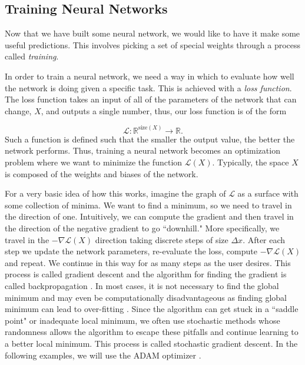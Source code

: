 \documentclass{CUP-JNL-DTM}%
\theoremstyle{definition}
\numberwithin{equation}{section}
\newcommand{\loss}{\mathcal{L}}
\newcommand{\Define}{\emph}
\begin{document}

\subsection{Training Neural Networks}

Now that we have built some neural network, we would like to have it make some useful predictions. This involves picking a set of special weights through a process called \Define{training}. 

In order to train a neural network, we need a way in which to evaluate how well the network is doing given a specific task. This is achieved with a \emph{loss function}. The loss function takes an input of all of the parameters of the network that can change, $X$, and outputs a single number, thus, our loss function is of the form

\begin{equation}
    \loss \colon \mathbb{R}^{\textrm{size}(X)} \rightarrow \mathbb{R}. 
\end{equation}
Such a function is defined such that the smaller the output value, the better the network performs. Thus, training a neural network becomes an optimization problem where we want to minimize the function $\loss(X)$. Typically, the space $X$ is composed of the weights and biases of the network. 

For a very basic idea of how this works, imagine the graph of $\loss$ as a surface with some collection of minima. We want to find a minimum, so we need to travel in the direction of one. Intuitively, we can compute the gradient and then travel in the direction of the negative gradient to go ``downhill." More specifically, we travel in the $-\nabla \loss(X)$ direction taking discrete steps of size $\Delta x$. After each step we update the network parameters, re-evaluate the loss, compute $-\nabla \loss(X)$ and repeat. We continue in this way for as many steps as the user desires. This process is called gradient descent and the algorithm for finding the gradient is called backpropagation \cite{chauvinBackpropagationTheoryArchitectures1995}. In most cases, it is not necessary to find the global minimum and may even be computationally disadvantageous as finding global minimum can lead to over-fitting \cite{choromanskaLossSurfacesMultilayer2015}. Since the algorithm can get stuck in a ``saddle point" or inadequate local minimum, we often use stochastic methods whose randomness allows the algorithm to escape these pitfalls and continue learning to a better local minimum. This process is called stochastic gradient descent. In the following examples, we will use the ADAM optimizer \cite{kingmaAdamMethodStochastic2017}. 
\end{document}
